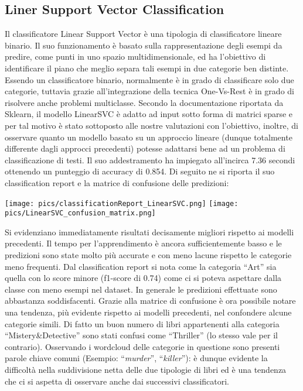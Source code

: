 \documentclass[12pt,oneside]{article}
\begin{document}
    \begin{enumerate}
    \subsection{Liner Support Vector Classification}
    \begin{justify}
        Il classificatore Linear Support Vector è una tipologia di classificatore lineare binario. Il suo funzionamento è basato sulla rappresentazione degli esempi da predire, come punti in uno spazio multidimensionale, ed ha l’obiettivo di identificare il piano che meglio separa tali esempi in due categorie ben distinte. Essendo un classificatore binario, normalmente è in grado di classificare solo due categorie, tuttavia grazie all’integrazione della tecnica One-Vs-Rest è in grado di risolvere anche problemi multiclasse. 
        Secondo la documentazione riportata da Sklearn, il modello LinearSVC è adatto ad input sotto forma di matrici sparse e per tal motivo è stato sottoposto alle nostre valutazioni con l’obiettivo, inoltre, di osservare quanto un modello basato su un approccio lineare (dunque totalmente differente dagli approcci precedenti) potesse adattarsi bene ad un problema di classificazione di testi.
        Il suo addestramento ha impiegato all’incirca 7.36 secondi ottenendo un punteggio di accuracy di 0.854. 
        Di seguito ne si riporta il suo classification report e la matrice di confusione delle predizioni:
        \end{justify}

        \texttt{[image: pics/classificationReport\_LinearSVC.png]}
        \texttt{[image: pics/LinearSVC\_confusion\_matrix.png]}

        
        \begin{justify}
        Si evidenziano immediatamente risultati decisamente migliori rispetto ai modelli precedenti. Il tempo per l’apprendimento è ancora sufficientemente basso e le predizioni sono state molto più accurate e con meno lacune rispetto le categorie meno frequenti. Dal classification report si nota come la categoria “Art” sia quella con lo score minore (f1-score di 0.74) come ci si poteva aspettare dalla classe con meno esempi nel dataset. In generale le predizioni effettuate sono abbastanza soddisfacenti. Grazie alla matrice di confusione è ora possibile notare una tendenza, più evidente rispetto ai modelli precedenti, nel confondere alcune categorie simili. Di fatto un buon numero di libri appartenenti alla categoria “Mistery\&Detective” sono stati confusi come “Thriller” (lo stesso vale per il contrario). Osservando i wordcloud delle categorie in questione sono presenti parole chiave comuni (Esempio: “\textit{murder}”, “\textit{killer}”): è dunque evidente la difficoltà nella suddivisione netta delle due tipologie di libri ed è una tendenza che ci si aspetta di osservare anche dai successivi classificatori.
    \end{justify}
    \end{enumerate}
\end{document}
